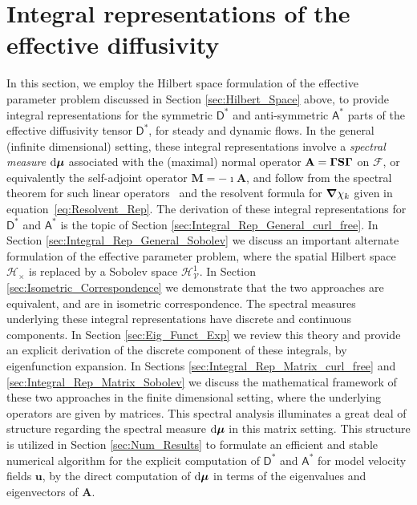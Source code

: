 \documentclass[leqno,onefignum,onetabnum]{siamltex1213}
\renewcommand{\d}{\mathrm{d}}
\newcommand{\Mb}{\mathbf{M}}
\newcommand{\Sb}{\mathbf{S}}
\newcommand{\Ab}{\mathbf{A}}
\newcommand{\Vc}{\mathcal{V}}
\newcommand{\Hc}{\mathcal{H}}
\newcommand{\Fc}{\mathcal{F}}
\newcommand{\Dm}{\mathsf{D}}
\newcommand{\Am}{\mathsf{A}}
\newcommand{\Hs}{\mathscr{H}}
\newcommand\bmu{\mbox{\boldmath${\mu}$}}
\newcommand\bGamma{\mbox{\boldmath${\Gamma}$}}
\newcommand\bnabla{\mbox{\boldmath${\nabla}$}}
\newcommand{\vecu}{\boldsymbol{u}}
\begin{document}
\section{Integral representations of the effective
  diffusivity} \label{sec:Integral_Rep} 
%
In this section, we employ the Hilbert space formulation of the
effective parameter problem discussed in Section
\ref{sec:Hilbert_Space} above, to provide integral representations for the
symmetric $\Dm^*$ and anti-symmetric $\Am^*$ parts of the
effective diffusivity tensor $\Dm^*$, for steady and dynamic
flows. In the general (infinite dimensional) setting, these integral
representations involve a \emph{spectral measure} $\d\bmu$ associated
with the (maximal) normal operator $\Ab=\bGamma\Sb\bGamma$ on $\Fc$,
or equivalently the self-adjoint operator $\Mb=-\imath\Ab$, and follow from
the spectral theorem for such linear
operators~\cite{Reed-1980,Stone:64} and the resolvent formula for
$\bnabla \chi_k$ 
given in equation~\eqref{eq:Resolvent_Rep}. The derivation of these
integral representations for $\Dm^*$ and $\Am^*$ is the topic
of Section \ref{sec:Integral_Rep_General_curl_free}. In Section
\ref{sec:Integral_Rep_General_Sobolev} we discuss an important
alternate formulation of the effective parameter problem, where the
spatial Hilbert space $\Hc_\times$ is replaced by a Sobolev space
$\Hs^1_{\Vc}$. In Section \ref{sec:Isometric_Correspondence} we
demonstrate that the two approaches are equivalent, and are in
isometric correspondence. The spectral measures underlying these
integral representations have discrete and continuous components. In
Section \ref{sec:Eig_Funct_Exp} we review this theory and provide an
explicit derivation of the discrete component of these integrals, by
eigenfunction expansion. In Sections
\ref{sec:Integral_Rep_Matrix_curl_free} and
\ref{sec:Integral_Rep_Matrix_Sobolev} we discuss the mathematical
framework of these two approaches in the finite dimensional setting, 
where the underlying operators are given by matrices. This spectral
analysis illuminates a great deal of structure regarding the spectral
measure $\d\bmu$ in this matrix setting. This structure is utilized in
Section \ref{sec:Num_Results} to formulate an efficient and stable
numerical algorithm for the explicit computation of $\Dm^*$ and
$\Am^*$ for model velocity fields $\vecu $, by the direct
computation of $\d\bmu$ in terms of the eigenvalues and eigenvectors
of $\Ab$.    
\end{document}
